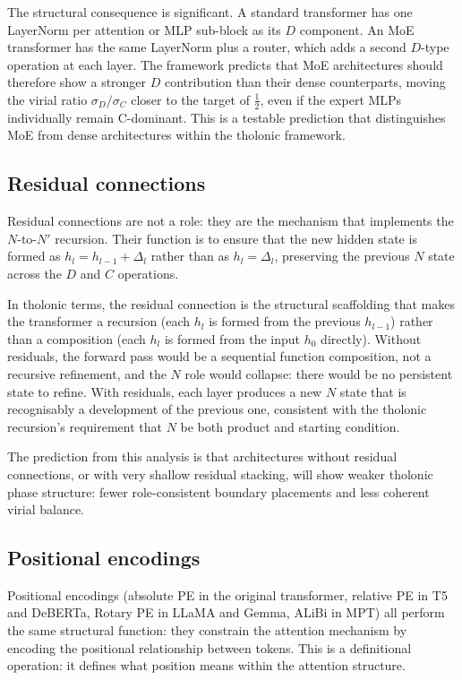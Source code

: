 \documentclass[12pt]{article}
\begin{document}
The structural consequence is significant. A standard transformer has
one LayerNorm per attention or MLP sub-block as its \(D\) component. An
MoE transformer has the same LayerNorm plus a router, which adds a
second \(D\)-type operation at each layer. The framework predicts that
MoE architectures should therefore show a stronger \(D\) contribution
than their dense counterparts, moving the virial ratio
\(\sigma_D / \sigma_C\) closer to the target of \(\frac{1}{2}\), even if
the expert MLPs individually remain C-dominant. This is a testable
prediction that distinguishes MoE from dense architectures within the
tholonic framework.

\subsection{Residual connections}\label{residual-connections}

Residual connections are not a role: they are the mechanism that
implements the \(N\)-to-\(N'\) recursion. Their function is to ensure
that the new hidden state is formed as \(h_l = h_{l-1} + \Delta_l\)
rather than as \(h_l = \Delta_l\), preserving the previous \(N\) state
across the \(D\) and \(C\) operations.

In tholonic terms, the residual connection is the structural scaffolding
that makes the transformer a recursion (each \(h_l\) is formed from the
previous \(h_{l-1}\)) rather than a composition (each \(h_l\) is formed
from the input \(h_0\) directly). Without residuals, the forward pass
would be a sequential function composition, not a recursive refinement,
and the \(N\) role would collapse: there would be no persistent state to
refine. With residuals, each layer produces a new \(N\) state that is
recognisably a development of the previous one, consistent with the
tholonic recursion's requirement that \(N\) be both product and starting
condition.

The prediction from this analysis is that architectures without residual
connections, or with very shallow residual stacking, will show weaker
tholonic phase structure: fewer role-consistent boundary placements and
less coherent virial balance.

\subsection{Positional encodings}\label{positional-encodings}

Positional encodings (absolute PE in the original transformer, relative
PE in T5 and DeBERTa, Rotary PE in LLaMA and Gemma, ALiBi in MPT) all
perform the same structural function: they constrain the attention
mechanism by encoding the positional relationship between tokens. This
is a definitional operation: it defines what position means within the
attention structure.
\end{document}
